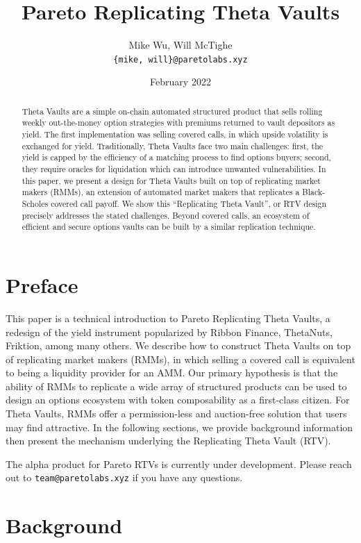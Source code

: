 \documentclass[hidelinks, 12pt]{article}
\title{Pareto Replicating Theta Vaults}
\author{Mike Wu, Will McTighe \\ \small\texttt{\{mike, will\}@paretolabs.xyz}}
\date{February 2022}
\begin{document}
\maketitle

\tableofcontents

\begin{abstract}
Theta Vaults are a simple on-chain automated structured product that sells rolling weekly out-the-money option strategies with premiums returned to vault depositors as yield. The first implementation was selling covered calls, in which upside volatility is exchanged for yield.
Traditionally, Theta Vaults face two main challenges: first, the yield is capped by the efficiency of a matching process to find options buyers; second, they require oracles for liquidation which can introduce unwanted vulnerabilities.
In this paper, we present a design for Theta Vaults built on top of replicating market makers (RMMs), an extension of automated market makers that replicates a Black-Scholes covered call payoff.
We show this ``Replicating Theta Vault'', or RTV design precisely addresses the stated challenges.
Beyond covered calls, an ecosystem of efficient and secure options vaults can be built by a similar replication technique.
\end{abstract}

\section{Preface}

This paper is a technical introduction to Pareto Replicating Theta Vaults, a redesign of the yield instrument popularized by Ribbon Finance, ThetaNuts, Friktion, among many others. We describe how to construct Theta Vaults on top of replicating market makers (RMMs), in which selling a covered call is equivalent to being a liquidity provider for an AMM. Our primary hypothesis is that the ability of RMMs to replicate a wide array of structured products can be used to design an options ecosystem with token composability as a first-class citizen. For Theta Vaults, RMMs offer a permission-less and auction-free solution that users may find attractive. In the following sections, we provide background information then present the mechanism underlying the Replicating Theta Vault (RTV).

The alpha product for Pareto RTVs is currently under development. Please reach out to \texttt{team@paretolabs.xyz} if you have any questions.

\section{Background}
\end{document}
